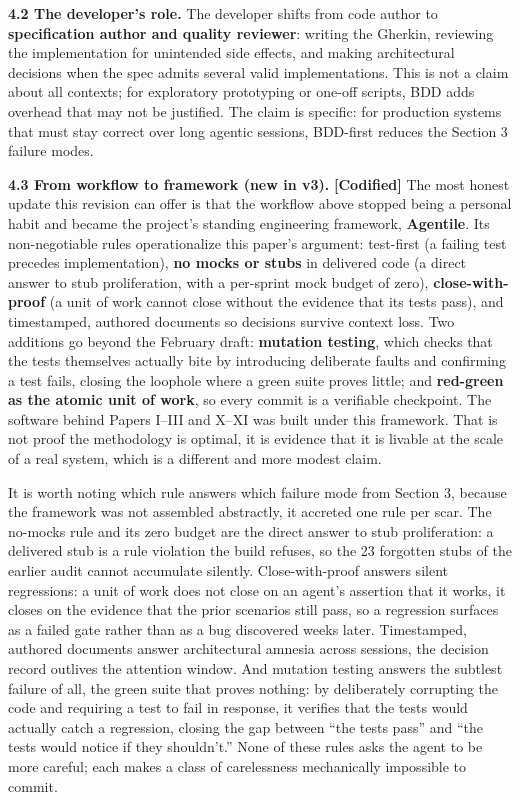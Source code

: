 \textbf{4.2 The developer's role.} The developer shifts from code author
to \textbf{specification author and quality reviewer}: writing the
Gherkin, reviewing the implementation for unintended side effects, and
making architectural decisions when the spec admits several valid
implementations. This is not a claim about all contexts; for exploratory
prototyping or one-off scripts, BDD adds overhead that may not be
justified. The claim is specific: for production systems that must stay
correct over long agentic sessions, BDD-first reduces the Section 3
failure modes.

\textbf{4.3 From workflow to framework (new in v3).}
\textbf{{[}Codified{]}} The most honest update this revision can offer
is that the workflow above stopped being a personal habit and became the
project's standing engineering framework, \textbf{Agentile}. Its
non-negotiable rules operationalize this paper's argument: test-first (a
failing test precedes implementation), \textbf{no mocks or stubs} in
delivered code (a direct answer to stub proliferation, with a per-sprint
mock budget of zero), \textbf{close-with-proof} (a unit of work cannot
close without the evidence that its tests pass), and timestamped,
authored documents so decisions survive context loss. Two additions go
beyond the February draft: \textbf{mutation testing}, which checks that
the tests themselves actually bite by introducing deliberate faults and
confirming a test fails, closing the loophole where a green suite proves
little; and \textbf{red-green as the atomic unit of work}, so every
commit is a verifiable checkpoint. The software behind Papers I--III and
X--XI was built under this framework. That is not proof the methodology
is optimal, it is evidence that it is livable at the scale of a real
system, which is a different and more modest claim.

It is worth noting which rule answers which failure mode from Section 3,
because the framework was not assembled abstractly, it accreted one rule
per scar. The no-mocks rule and its zero budget are the direct answer to
stub proliferation: a delivered stub is a rule violation the build
refuses, so the 23 forgotten stubs of the earlier audit cannot
accumulate silently. Close-with-proof answers silent regressions: a unit
of work does not close on an agent's assertion that it works, it closes
on the evidence that the prior scenarios still pass, so a regression
surfaces as a failed gate rather than as a bug discovered weeks later.
Timestamped, authored documents answer architectural amnesia across
sessions, the decision record outlives the attention window. And
mutation testing answers the subtlest failure of all, the green suite
that proves nothing: by deliberately corrupting the code and requiring a
test to fail in response, it verifies that the tests would actually
catch a regression, closing the gap between ``the tests pass'' and ``the
tests would notice if they shouldn't.'' None of these rules asks the
agent to be more careful; each makes a class of carelessness
mechanically impossible to commit.

